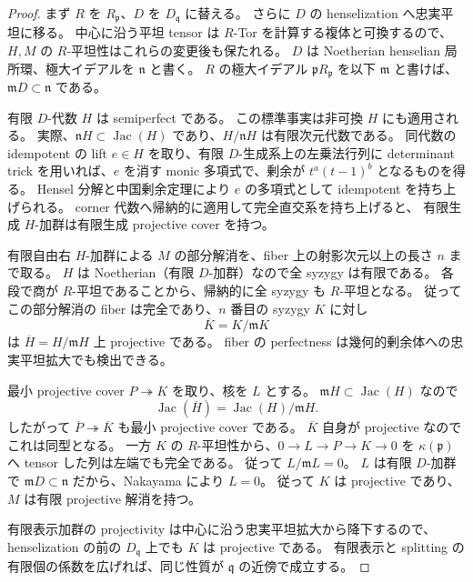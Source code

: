 \begin{proof}
まず $R$ を $R_{\mathfrak p}$、$D$ を $D_{\mathfrak q}$ に替える。
さらに $D$ の henselization へ忠実平坦に移る。
中心に沿う平坦 tensor は $R$-Tor を計算する複体と可換するので、
$H,M$ の $R$-平坦性はこれらの変更後も保たれる。
$D$ は Noetherian henselian 局所環、極大イデアルを $\mathfrak n$ と書く。
$R$ の極大イデアル $\mathfrak pR_{\mathfrak p}$ を以下 $\mathfrak m$ と書けば、
$\mathfrak mD\subset\mathfrak n$ である。

有限 $D$-代数 $H$ は semiperfect である。
この標準事実は非可換 $H$ にも適用される。
実際、$\mathfrak nH\subset\operatorname{Jac}(H)$ であり、$H/\mathfrak nH$ は有限次元代数である。
同代数の idempotent の lift $e\in H$ を取り、有限 $D$-生成系上の左乗法行列に
determinant trick を用いれば、$e$ を消す monic 多項式で、剰余が
$t^a(t-1)^b$ となるものを得る。
Hensel 分解と中国剰余定理により $e$ の多項式として idempotent を持ち上げられる。
corner 代数へ帰納的に適用して完全直交系を持ち上げると、
有限生成 $H$-加群は有限生成 projective cover を持つ。

有限自由右 $H$-加群による $M$ の部分解消を、fiber 上の射影次元以上の長さ $n$ まで取る。
$H$ は Noetherian（有限 $D$-加群）なので全 syzygy は有限である。
各段で商が $R$-平坦であることから、帰納的に全 syzygy も $R$-平坦となる。
従ってこの部分解消の fiber は完全であり、$n$ 番目の syzygy $K$ に対し
\[
 \overline K=K/\mathfrak mK
\]
は $\overline H=H/\mathfrak mH$ 上 projective である。
fiber の perfectness は幾何的剰余体への忠実平坦拡大でも検出できる。

最小 projective cover $P\twoheadrightarrow K$ を取り、核を $L$ とする。
$\mathfrak mH\subset\operatorname{Jac}(H)$ なので
\[
 \operatorname{Jac}(\overline H)=\operatorname{Jac}(H)/\mathfrak mH.
\]
したがって $\overline P\twoheadrightarrow\overline K$ も最小 projective cover である。
$\overline K$ 自身が projective なのでこれは同型となる。
一方 $K$ の $R$-平坦性から、$0\to L\to P\to K\to0$ を
$\kappa(\mathfrak p)$ へ tensor した列は左端でも完全である。
従って $L/\mathfrak mL=0$。
$L$ は有限 $D$-加群で $\mathfrak mD\subset\mathfrak n$ だから、Nakayama により $L=0$。
従って $K$ は projective であり、$M$ は有限 projective 解消を持つ。

有限表示加群の projectivity は中心に沿う忠実平坦拡大から降下するので、
henselization の前の $D_{\mathfrak q}$ 上でも $K$ は projective である。
有限表示と splitting の有限個の係数を広げれば、同じ性質が $\mathfrak q$ の近傍で成立する。
\end{proof}

